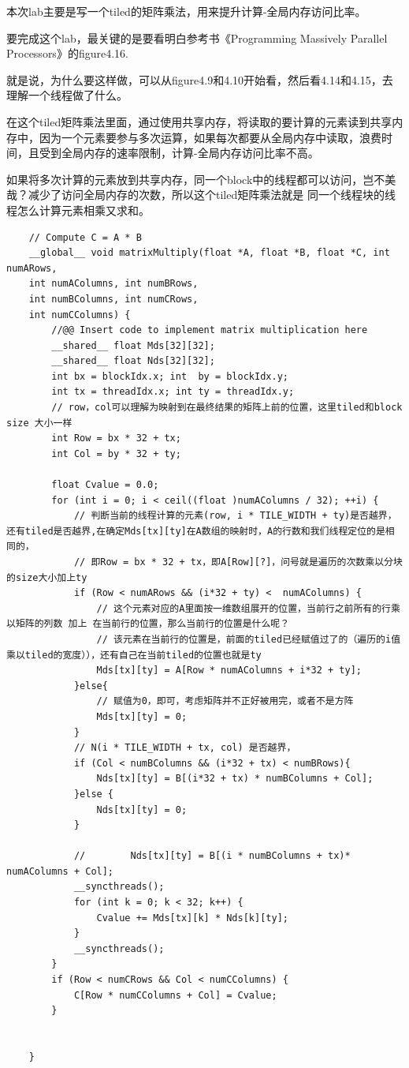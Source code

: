 \documentclass[11pt]{ctexart}
\begin{document}
本次lab主要是写一个tiled的矩阵乘法，用来提升计算-全局内存访问比率。

要完成这个lab，最关键的是要看明白参考书《Programming Massively Parallel Processors》的figure4.16.

就是说，为什么要这样做，可以从figure4.9和4.10开始看，然后看4.14和4.15，去理解一个线程做了什么。

在这个tiled矩阵乘法里面，通过使用共享内存，将读取的要计算的元素读到共享内存中，因为一个元素要参与多次运算，如果每次都要从全局内存中读取，浪费时间，且受到全局内存的速率限制，计算-全局内存访问比率不高。

如果将多次计算的元素放到共享内存，同一个block中的线程都可以访问，岂不美哉？减少了访问全局内存的次数，所以这个tiled矩阵乘法就是 同一个线程块的线程怎么计算元素相乘又求和。

\begin{lstlisting}
	// Compute C = A * B
	__global__ void matrixMultiply(float *A, float *B, float *C, int numARows,
	int numAColumns, int numBRows,
	int numBColumns, int numCRows,
	int numCColumns) {
		//@@ Insert code to implement matrix multiplication here
		__shared__ float Mds[32][32];
		__shared__ float Nds[32][32];
		int bx = blockIdx.x; int  by = blockIdx.y;
		int tx = threadIdx.x; int ty = threadIdx.y;
		// row，col可以理解为映射到在最终结果的矩阵上前的位置，这里tiled和block size 大小一样
		int Row = bx * 32 + tx;
		int Col = by * 32 + ty;
		
		float Cvalue = 0.0;
		for (int i = 0; i < ceil((float )numAColumns / 32); ++i) {
			// 判断当前的线程计算的元素(row, i * TILE_WIDTH + ty)是否越界，还有tiled是否越界,在确定Mds[tx][ty]在A数组的映射时，A的行数和我们线程定位的是相同的，
			// 即Row = bx * 32 + tx，即A[Row][?]，问号就是遍历的次数乘以分块的size大小加上ty
			if (Row < numARows && (i*32 + ty) <  numAColumns) {
				// 这个元素对应的A里面按一维数组展开的位置，当前行之前所有的行乘以矩阵的列数 加上 在当前行的位置，那么当前行的位置是什么呢？
				// 该元素在当前行的位置是，前面的tiled已经赋值过了的（遍历的i值乘以tiled的宽度）），还有自己在当前tiled的位置也就是ty
				Mds[tx][ty] = A[Row * numAColumns + i*32 + ty];
			}else{
				// 赋值为0，即可，考虑矩阵并不正好被用完，或者不是方阵
				Mds[tx][ty] = 0;
			}
			// N(i * TILE_WIDTH + tx, col) 是否越界，
			if (Col < numBColumns && (i*32 + tx) < numBRows){
				Nds[tx][ty] = B[(i*32 + tx) * numBColumns + Col];
			}else {
				Nds[tx][ty] = 0;
			}
			
			//        Nds[tx][ty] = B[(i * numBColumns + tx)* numAColumns + Col];
			__syncthreads();
			for (int k = 0; k < 32; k++) {
				Cvalue += Mds[tx][k] * Nds[k][ty];
			}
			__syncthreads();
		}
		if (Row < numCRows && Col < numCColumns) {
			C[Row * numCColumns + Col] = Cvalue;
		}
		
		
	}
\end{lstlisting}
\end{document}
